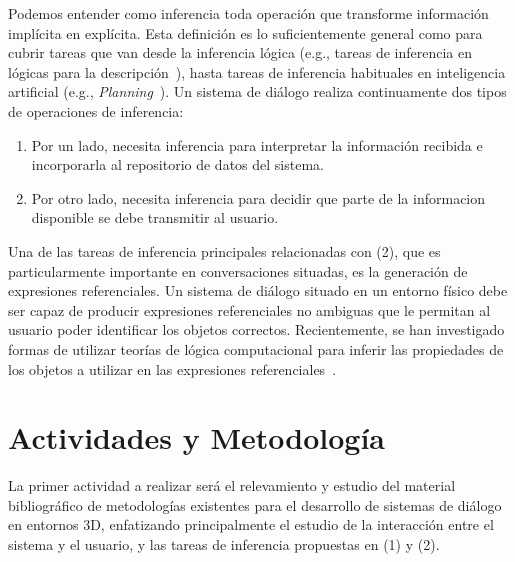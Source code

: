 \documentclass[10.9pt,a4paper]{article}
\begin{document}
Podemos entender como inferencia toda operaci\'on que transforme 
informaci\'on impl\'icita en expl\'icita. Esta definici\'on es lo 
suficientemente general como para cubrir tareas que van desde la 
inferencia l\'ogica (e.g., tareas de inferencia en l\'ogicas para la 
descripci\'on~\citep{DBLP:conf/dlog/2003handbook}), hasta tareas de 
inferencia habituales en inteligencia artificial (e.g., 
\emph{Planning}~\citep{nau04,beno:mus11,beno:aaa11}). 
Un sistema de di\'alogo realiza continuamente dos tipos de operaciones de 
inferencia:
\begin{enumerate}[(1)]
    \item  Por un lado, necesita inferencia para interpretar la 
    informaci\'on recibida e incorporarla al repositorio de datos del sistema.
    \item Por otro lado, necesita inferencia para decidir que parte de la 
    informacion disponible se debe transmitir al usuario.
\end{enumerate}

Una de las tareas de inferencia principales relacionadas con (2), que es 
particularmente importante en conversaciones situadas, es la generaci\'on 
de expresiones referenciales. Un sistema de di\'alogo situado en un 
entorno f\'isico debe ser capaz de producir expresiones referenciales no 
ambiguas que le permitan al usuario poder identificar los objetos
correctos. Recientemente, se han investigado formas de utilizar 
teor\'ias de l\'ogica computacional para inferir las propiedades de los 
objetos a utilizar en las expresiones 
referenciales~\citep{arec:refe08,arec:usin11,altamirano-areces-benotti:2012:POSTERS}.




\section{Actividades y Metodolog\'ia}

La primer actividad a realizar ser\'a el relevamiento y estudio del material 
bibliogr\'afico de metodolog\'ias existentes para el desarrollo de sistemas 
de di\'alogo en entornos 3D, enfatizando principalmente el estudio de la
interacci\'on entre el sistema y el usuario, y las tareas de inferencia 
propuestas en (1) y (2).
\end{document}
